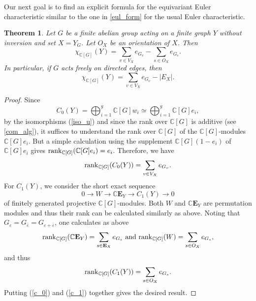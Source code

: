 \documentclass[11pt]{amsart}
\newtheorem{theorem}{Theorem}[section]
\numberwithin{equation}{section}
\theoremstyle{remark}
\theoremstyle{definition}
\begin{document}
Our next goal is to find an explicit formula for the equivariant Euler characteristic similar to the one in \cref{eul_form} for the usual Euler characteristic.  
\begin{theorem} \label{exp_equi_euler_char}
Let $G$ be a finite abelian group acting on a finite graph $Y$ without inversion and set $X = Y_{G}$.  Let $O_{X}$ be an orientation of $X$.  Then
$$\chi_{\mathbb{C}[G]}(Y) = \sum_{v \in V_{X}} e_{G_{v}} - \sum_{s \in O_{X}}e_{G_{s}}.$$
In particular, if $G$ acts freely on directed edges, then
$$\chi_{\mathbb{C}[G]}(Y) = \sum_{v \in V_{X}} e_{G_{v}} - |E_{X}|.$$
\end{theorem}
\begin{proof}
Since
$$C_{0}(Y) = \bigoplus_{i = 1}^{g}\mathbb{C}[G]w_{i} \simeq \bigoplus_{i=1}^{g} \mathbb{C}[G]e_{i}, $$
by the isomorphisms (\ref{iso_u}) and since the rank over $\mathbb{C}[G]$ is additive (see \cref{com_alg}), it suffices to understand the rank over $\mathbb{C}[G]$ of the $\mathbb{C}[G]$-modules $\mathbb{C}[G]e_{i}$.  But a simple calculation using the supplement $\mathbb{C}[G](1-e_{i})$ of $\mathbb{C}[G]e_{i}$ gives ${\rm rank}_{\mathbb{C}[G]}(\mathbb{C}[G]e_{i}) = e_{i}$.  Therefore, we have
\begin{equation} \label{c_0}
{\rm rank}_{\mathbb{C}[G]} (C_{0}(Y)) = \sum_{v \in V_{X}} e_{G_{v}}. 
\end{equation}
For $C_{1}(Y)$, we consider the short exact sequence
$$0 \rightarrow W \rightarrow \mathbb{C}\mathbf{E}_{Y} \rightarrow C_{1}(Y) \rightarrow 0 $$
of finitely generated projective $\mathbb{C}[G]$-modules.  Both $W$ and $\mathbb{C}\mathbf{E}_{Y}$ are permutation modules and thus their rank can be calculated similarly as above.  Noting that $G_{\varepsilon} = G_{\bar{\varepsilon}} = G_{\varepsilon + \bar{\varepsilon}}$, one calculates as above
$${\rm rank}_{\mathbb{C}[G]}(\mathbb{C}\mathbf{E}_{Y}) = \sum_{s \in \mathbf{E}_{X}}e_{G_{s}} \text{ and } {\rm rank}_{\mathbb{C}[G]}(W) = \sum_{s \in O_{X}}e_{G_{s}}, $$
and thus
\begin{equation} \label{c_1}
{\rm rank}_{\mathbb{C}[G]}(C_{1}(Y)) = \sum_{s \in O_{X}}e_{G_{s}}.
\end{equation}
Putting (\ref{c_0}) and (\ref{c_1}) together gives the desired result.




\end{proof}


\end{document}
